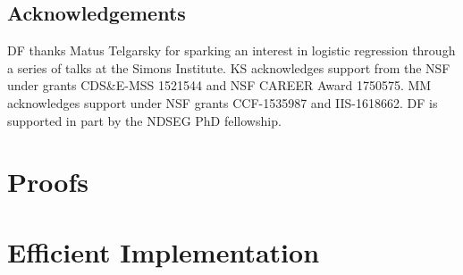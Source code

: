 \documentclass[final,12pt]{colt2018}
\begin{document}

\subsection*{Acknowledgements}
DF thanks Matus Telgarsky for sparking an interest in logistic regression through a series of talks at the Simons Institute. KS acknowledges support from the NSF under grants CDS\&E-MSS 1521544 and NSF CAREER Award 1750575.  MM acknowledges support under NSF grants CCF-1535987 and IIS-1618662. DF is supported in part by the NDSEG PhD fellowship.

{\small

}

\appendix

\section{Proofs}
\label{app:proofs}


\section{Efficient Implementation}
\label{app:efficient}

\end{document}
